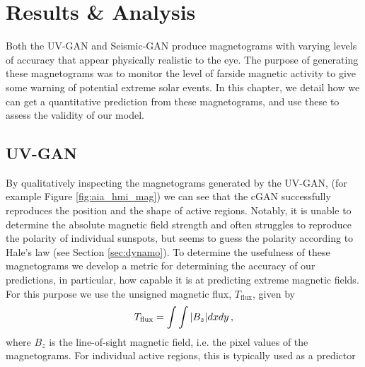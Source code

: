 \documentclass[11pt,a4paper,onecolumn]{report}
\begin{document}
%
%
%
%
%
%
%
\chapter{Results \& Analysis}
%
%
%
%
%
%
\label{chap:results_and_analysis}

Both the UV-GAN and Seismic-GAN produce magnetograms with varying levels of
accuracy that appear physically realistic to the eye. The purpose of generating
these magnetograms was to monitor the level of farside magnetic activity to give
some warning of potential extreme solar events. In this chapter, we detail how
we can get a quantitative prediction from these magnetograms, and use these to
assess the validity of our model. 

\section{UV-GAN}
By qualitatively inspecting the magnetograms generated by the UV-GAN, (for
example Figure \ref{fig:aia_hmi_mag}) we can see that the cGAN successfully
reproduces the position and the shape of active regions. Notably, it is
unable to determine the absolute magnetic field strength and often struggles to
reproduce the polarity of individual sunspots, but seems to guess the polarity
according to Hale's law (see Section \ref{sec:dynamo}).
To determine the usefulness of these magnetograms we develop a metric for
determining the accuracy of our predictions, in particular, how capable it is at
predicting extreme magnetic fields. 
For this purpose we use the unsigned magnetic flux,
\(T_{\text{flux}}\), given by
\begin{align}
  T_{\text{flux}} = \int \int \absolutevalue{B_z} dx dy \, ,
\end{align}
where \(B_z\) is the line-of-sight magnetic field, i.e. the pixel values of the
magnetograms. For individual active regions, this is typically used as a predictor
\end{document}
